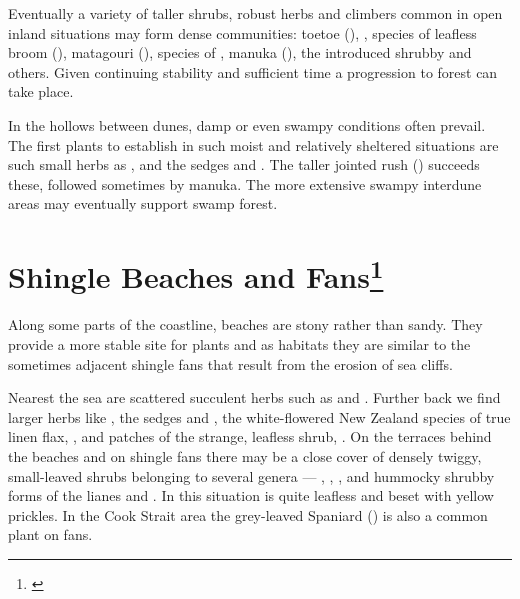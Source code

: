Eventually a variety of taller shrubs, robust herbs and climbers common in open inland situations may form dense communities: toetoe (),  , species of leafless broom (), matagouri (), species of , manuka (), the introduced shrubby  and others.
Given continuing stability and sufficient time a progression to forest can take place.

In the hollows between dunes, damp or even swampy conditions often prevail.
The first plants to establish in such moist and relatively sheltered situations are such small herbs as ,  and the sedges  and .
The taller jointed rush () succeeds these, followed sometimes by manuka.
The more extensive swampy interdune areas may eventually support swamp forest.

\section[Shingle Beaches and Fans]{Shingle Beaches and Fans\footnote{\cite{moore1963plants}}}

Along some parts of the coastline, beaches are stony rather than sandy.
They provide a more stable site for plants and as habitats they are similar to the sometimes adjacent shingle fans that result from the erosion of sea cliffs.

Nearest the sea are scattered succulent herbs such as  and .
Further back we find larger herbs like , the sedges  and , the white-flowered New Zealand species of true linen flax, , and patches of the strange, leafless shrub, .
On the terraces behind the beaches and on shingle fans there may be a close cover of densely twiggy, small-leaved shrubs belonging to several genera --- , ,  ,   and hummocky shrubby forms of the lianes  and .
In this situation  is quite leafless and beset with yellow prickles.
In the Cook Strait area the grey-leaved Spaniard () is also a common plant on fans.

